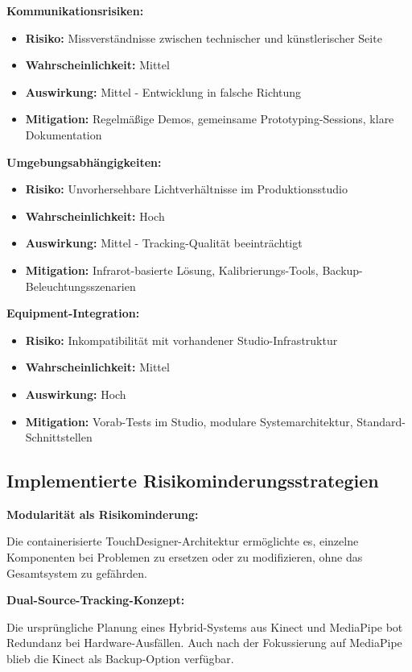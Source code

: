 \textbf{Kommunikationsrisiken:}
\begin{itemize}
    \item \textbf{Risiko:} Missverständnisse zwischen technischer und künstlerischer Seite
    \item \textbf{Wahrscheinlichkeit:} Mittel
    \item \textbf{Auswirkung:} Mittel - Entwicklung in falsche Richtung
    \item \textbf{Mitigation:} Regelmäßige Demos, gemeinsame Prototyping-Sessions, klare Dokumentation
\end{itemize}

\textbf{Umgebungsabhängigkeiten:}
\begin{itemize}
    \item \textbf{Risiko:} Unvorhersehbare Lichtverhältnisse im Produktionsstudio
    \item \textbf{Wahrscheinlichkeit:} Hoch
    \item \textbf{Auswirkung:} Mittel - Tracking-Qualität beeinträchtigt
    \item \textbf{Mitigation:} Infrarot-basierte Lösung, Kalibrierungs-Tools, Backup-Beleuchtungsszenarien
\end{itemize}

\textbf{Equipment-Integration:}
\begin{itemize}
    \item \textbf{Risiko:} Inkompatibilität mit vorhandener Studio-Infrastruktur
    \item \textbf{Wahrscheinlichkeit:} Mittel
    \item \textbf{Auswirkung:} Hoch
    \item \textbf{Mitigation:} Vorab-Tests im Studio, modulare Systemarchitektur, Standard-Schnittstellen
\end{itemize}

\subsection{Implementierte Risikominderungsstrategien}

\textbf{Modularität als Risikominderung:}
\raggedright Die containerisierte TouchDesigner-Architektur ermöglichte es, einzelne Komponenten bei Problemen zu ersetzen oder zu modifizieren, ohne das Gesamtsystem zu gefährden.

\textbf{Dual-Source-Tracking-Konzept:}
\raggedright Die ursprüngliche Planung eines Hybrid-Systems aus Kinect und MediaPipe bot Redundanz bei Hardware-Ausfällen. Auch nach der Fokussierung auf MediaPipe blieb die Kinect als Backup-Option verfügbar.

